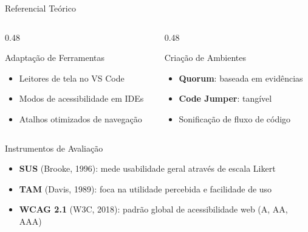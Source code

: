 \documentclass[aspectratio=169]{beamer}
\begin{document}
\begin{frame}{Referencial Teórico}
    \begin{columns}[T]
        \begin{column}{0.48\textwidth}
            \begin{block}{Adaptação de Ferramentas}
                \begin{itemize}\small
                    \item Leitores de tela no VS Code
                    \item Modos de acessibilidade em IDEs
                    \item Atalhos otimizados de navegação
                \end{itemize}
            \end{block}
        \end{column}
        \begin{column}{0.48\textwidth}
            \begin{block}{Criação de Ambientes}
                \begin{itemize}\small
                    \item \textbf{Quorum}: baseada em evidências
                    \item \textbf{Code Jumper}: tangível
                    \item Sonificação de fluxo de código
                \end{itemize}
            \end{block}
        \end{column}
    \end{columns}

    \vspace{0.15cm}

    \begin{block}{Instrumentos de Avaliação}
        \begin{itemize}\small
            \item \textbf{SUS} (Brooke, 1996): mede usabilidade geral através de escala Likert
            \item \textbf{TAM} (Davis, 1989): foca na utilidade percebida e facilidade de uso
            \item \textbf{WCAG 2.1} (W3C, 2018): padrão global de acessibilidade web (A, AA, AAA)
        \end{itemize}
    \end{block}

\end{frame}
\end{document}
